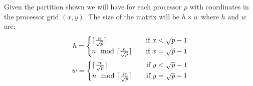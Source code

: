\documentclass[a4paper]{article}
\begin{document}
    Given the partition shown we will have for each processor $p$ with coordinates in the processor grid $(x,y)$. The size of the matrix will be $h \times w$ where $h$ and $w$ are:
    \begin{align}
    h = \begin{cases}
    \ceil{\frac{n}{\sqrt{p}}} \quad & \text{if  } x < \sqrt{p}-1\\
    n \mod \ceil{\frac{n}{\sqrt{p}}} \quad & \text{if  } x = \sqrt{p}-1\\
    \end{cases}\\
    w = \begin{cases}
    \ceil{\frac{n}{\sqrt{p}}} \quad & \text{if  } y < \sqrt{p}-1\\
    n \mod \ceil{\frac{n}{\sqrt{p}}} \quad & \text{if  } y = \sqrt{p}-1\\
    \end{cases}
    \end{align}
\end{document}
